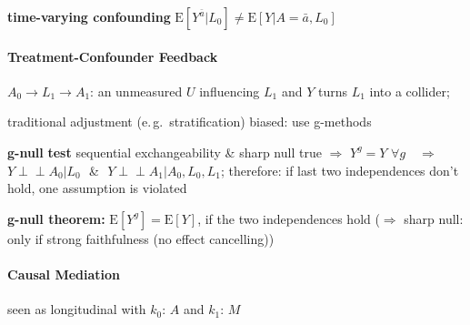 \documentclass[8pt,twoside]{extarticle}
\newcommand{\indep}{\perp \!\!\! \perp}
\begin{document}
\begin{multicols}{2}
{\begin{minipage}{28em}
\noindent \textbf{time-varying confounding} $\mathrm{E}\left[Y^{\bar{a}}|L_0\right] \neq \mathrm{E}\left[Y|A=\bar{a}, L_0\right]$


\end{minipage}}

\vspace{1.5em}

\noindent \colorbox{lightgray!20!white}{\begin{minipage}{28em}


\paragraph{Treatment-Confounder Feedback} $A_0 \rightarrow L_1 \rightarrow A_1$: an unmeasured $U$ influencing $L_1$ and $Y$ turns $L_1$ into a collider;

\noindent traditional adjustment (e.\,g.\ stratification) biased: use g-methods

\noindent \textbf{g-null\,\,test} sequential exchangeability \& sharp null true $\Rightarrow$ $Y^g {=} Y \,\, \forall g$ $\,\,\,\,\Rightarrow \,\,\,\,$ $Y {\indep} A_0|L_0\,\,$ \& \,\,$Y {\indep} A_1|A_0, L_0, L_1$;
therefore: \newline if last two independences don't hold, one assumption is violated

\noindent \textbf{g-null theorem:} $\mathrm{E}\left[Y^g\right] = \mathrm{E}\left[Y\right]$, if the two independences hold \newline($\Rightarrow$ sharp null: only if strong faithfulness (no effect cancelling))

\end{minipage}}

\vspace{1.5em}

\noindent \colorbox{lightgray!20!white}{\begin{minipage}{28em}

\paragraph{Causal Mediation} \citep{hernan2023causal}

\noindent {} seen as longitudinal with  $k_0$: $A$ and $k_1$: $M$



\end{minipage}}
\end{multicols}
\end{document}
